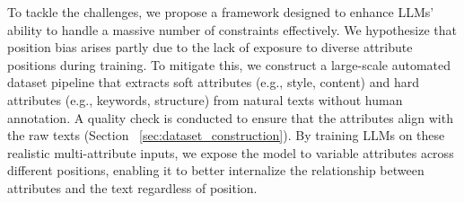 To tackle the challenges, we propose a framework designed to enhance LLMs’ ability to handle a massive number of constraints effectively. 
We hypothesize that position bias arises partly due to the lack of exposure to diverse attribute positions during training. To mitigate this, we construct a large-scale automated dataset pipeline that extracts soft attributes (e.g., style, content) and hard attributes (e.g., keywords, structure) from natural texts without human annotation. A quality check is conducted to ensure that the attributes align with the raw texts (Section ~\ref{sec:dataset_construction}). By training LLMs on these realistic multi-attribute inputs, we expose the model to variable attributes across different positions, enabling it to better internalize the relationship between attributes and the text regardless of position.

